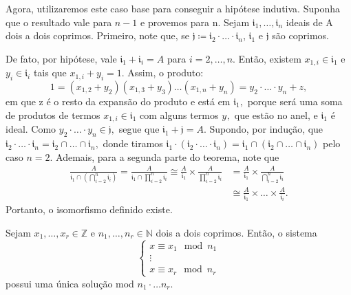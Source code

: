 \documentclass[algebraII_notes.tex]{subfiles}
\begin{document}
\begin{proof*}
	Agora, utilizaremos este caso base para conseguir a hipótese indutiva. Suponha que o resultado vale para \(n-1\) e provemos para n.
	Sejam \(\mathfrak{i}_{1}, \dotsc, \mathfrak{i}_{n}\) ideais de A dois a dois coprimos. Primeiro, note que,
	se \(\mathfrak{j}\coloneqq \mathfrak{i}_{2}\cdot \dotsc \cdot \mathfrak{i}_{n}\), \(\mathfrak{i}_{1}\) e \(\mathfrak{j}\) são coprimos.

	De fato, por hipótese, vale \(\mathfrak{i}_{1}+\mathfrak{i}_{i} = A\) para \(i=2, \dotsc, n.\) Então, existem
	\(x_{1, i}\in \mathfrak{i}_{1}\) e \(y_{i}\in \mathfrak{i}_{i}\) tais que \(x_{1, i}+y_{i} = 1.\) Assim, o produto:
	\[
		1 = (x_{1, 2} + y_{2})(x_{1, 3}+y_{3})\dotsc(x_{1, n}+y_{n}) = y_{2}\cdot \dotsc \cdot y_{n}+z,
	\]
	em que z é o resto da expansão do produto e está em \(\mathfrak{i}_{1},\) porque será uma soma de produtos de termos \(x_{1, i}\in \mathfrak{i}_{1}\) com alguns
	termos \(y_{},\) que estão no anel, e \(\mathfrak{i}_{1}\) é ideal. Como \(y_{2}\cdot \dotsc \cdot y_{n}\in \mathfrak{j},\) segue que  \(\mathfrak{i}_{1} + \mathfrak{j} = A.\)
	Supondo, por indução, que \(\mathfrak{i}_{2}\cdot \dotsc \cdot \mathfrak{i}_{n} = \mathfrak{i}_{2}\cap \dotsc \cap \mathfrak{i}_{n},\) donde tiramos
	\(\mathfrak{i}_{1}\cdot (\mathfrak{i}_{2}\cdot \dotsc \cdot \mathfrak{i}_{n}) = \mathfrak{i}_{1}\cap (\mathfrak{i}_{2}\cap \dotsc\cap \mathfrak{i}_{n})\) pelo caso \(n=2\).
	Ademais, para a segunda parte do teorema, note que
	\begin{align*}
		\frac{A}{\mathfrak{i}_{1}\cap(\bigcap_{i=2}^{n}\mathfrak{i}_{i})} = \frac{A}{\mathfrak{i}_{1}\cap \prod\limits_{i=2}^{n}\mathfrak{i}_{i}}\cong \frac{A}{\mathfrak{i}_{1}}\times \frac{A}{\prod\limits_{i=2}^{n}\mathfrak{i}_{i}} & =\frac{A}{\mathfrak{i}_{1}}\times \frac{A}{\bigcap_{i=2}^{n}\mathfrak{i}_{i}}   \\
		                                                                                                                                                                                                                                 & \cong \frac{A}{\mathfrak{i}_{1}}\times \dotsc\times \frac{A}{\mathfrak{i}_{i}}.
	\end{align*}
	Portanto, o isomorfismo definido existe. \qedsymbol
\end{proof*}
\begin{crl*}
	Sejam \(x_{1}, \dotsc, x_{r}\in \mathbb{Z}\) e \(n_{1}, \dotsc, n_{r}\in \mathbb{N}\) dois a dois coprimos. Então,
	o sistema
	\begin{equation*}
		\left\{\begin{array}{ll}
			x\equiv x_{1}\mod n_{1} \\
			\vdots                  \\
			x\equiv x_{r}\mod n_{r}
		\end{array}\right.
	\end{equation*}
	possui uma única solução mod \(n_{1}\cdot \dotsc n_{r}.\)
\end{crl*}
\end{document}
